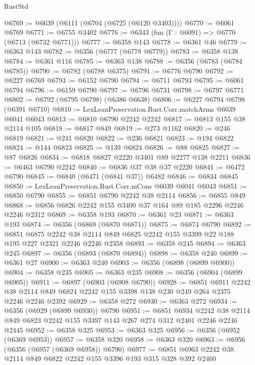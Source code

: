 \begin{lexlean}{RustStd}
\begin{coremodule}
{\begin{coremodule}
{{{{{{{{{{{{{{{{{{{{{{{{{{@6769 := @6639 (@6111 (@6704 (@6725 (@6120 @3403))))
@6770 := @6061 @6769
@6771 := @6755 @3402
@6776 := @6343 (fun (Γ : @6091) => @6770 (@6713 (@6732 @6771)))
@6777 := @6358 @143
@6778 := @6361 @46
@6779 := @6363 @143
@6782 := @6356 (@6777 (@6778 @6779))
@6783 := @6358 @138
@6784 := @6361 @116
@6785 := @6363 @138
@6788 := @6356 (@6783 (@6784 @6785))
@6790 := @6782 (@6788 @6375)
@6791 := @6776 @6790
@6792 := @6227 @6769
@6793 := @6152 @6790
@6794 := @6711 @6793
@6795 := @6061 @6794
@6796 := @6159 @6790
@6797 := @6796 @6731
@6798 := @6797 @6771
@6802 := @6792 (@6795 @6798) (@6386 @6638)
@6806 := @6227 @6794 @6798 (@6391 @6710)
@6810 := LexLeanPreservation.Rust.Corr.matchArms @6039 @6041 @6043
@6813 := @6810 @6790 @2242 @2242
@6817 := @6813 @155 @38 @2114 @105
@6818 := @6817 @849
@6819 := @273 @1162
@6820 := @246 @6819
@6821 := @241 @6820
@6822 := @236 @6821
@6823 := @194 @6822
@6824 := @144 @6823
@6825 := @139 @6824
@6826 := @88 @6825
@6827 := @87 @6826
@6834 := @6818 @6827 @2220 @3401 @89 @2277 @138 @2211
@6836 := @6463 @6790 @2242
@6840 := @6836 @37 @38 @37 @2220
@6841 := @6472 @6790
@6845 := @6840 (@6471 (@6841 @37)) @6482
@6846 := @6834 @6845
@6850 := LexLeanPreservation.Rust.Corr.mCons @6039 @6041 @6043
@6851 := @6850 @6790
@6855 := @6851 @6790 @2242 @38 @2114
@6856 := @6855 @849
@6868 := @6856 @6826 @2242 @155 @3400 @37 @164 @89 @185 @2296 @2246 @2246 @2312
@6869 := @6358 @193
@6870 := @6361 @23
@6871 := @6363 @193
@6874 := @6356 (@6869 (@6870 @6871))
@6875 := @6874 @6790
@6892 := @6851
    @6875
    @2242
    @38
    @2114
    @849
    @6825
    @2242
    @155
    @3399
    @22
    @188
    @195
    @227
    @2321
    @2246
    @2246
    @2358
@6893 := @6358 @245
@6894 := @6363 @245
@6897 := @6356 (@6893 (@6870 @6894))
@6898 := @6358 @240
@6899 := @6361 @27
@6900 := @6363 @240
@6903 := @6356 (@6898 (@6899 @6900))
@6904 := @6358 @235
@6905 := @6363 @235
@6908 := @6356 (@6904 (@6899 @6905))
@6911 := @6897 (@6903 (@6908 @6790))
@6928 := @6851
    @6911
    @2242
    @38
    @2114
    @849
    @6824
    @2242
    @155
    @3398
    @138
    @230
    @249
    @264
    @2375
    @2246
    @2246
    @2392
@6929 := @6358 @272
@6930 := @6363 @272
@6934 := @6356 (@6929 (@6899 @6930)) @6790
@6951 := @6851
    @6934
    @2242
    @38
    @2114
    @849
    @6823
    @2242
    @155
    @3397
    @143
    @267
    @274
    @312
    @2401
    @2246
    @2246
    @2445
@6952 := @6358 @325
@6953 := @6363 @325
@6956 := @6356 (@6952 (@6369 @6953))
@6957 := @6358 @320
@6958 := @6363 @320
@6963 := @6956 (@6356 (@6957 (@6369 @6958)) @6790)
@6977 := @6851 @6963 @2242 @38 @2114 @849 @6822 @2242 @155 @3396 @193 @315 @328 @392 @2460
}}}}}}}}}}}}}}}}}}}}}}}}}}
\end{coremodule}}
\end{coremodule}
\end{lexlean}
